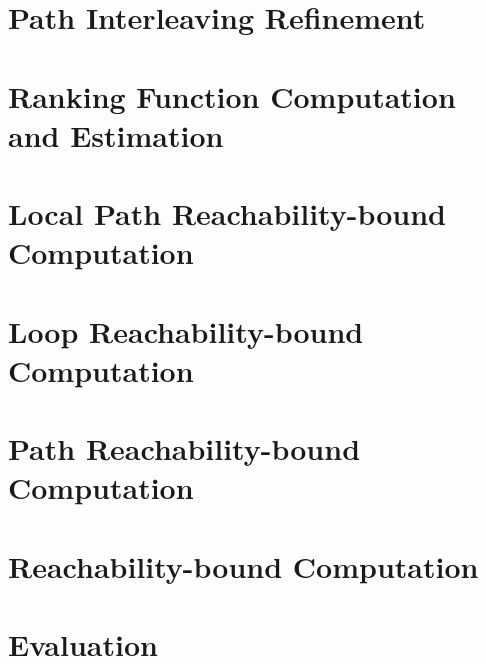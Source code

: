 \documentclass[manuscript,acmsmall,anonymous,review,screen,nonacm=true, authorversion=true]{acmart}
\begin{document}
\section{Path Interleaving Refinement}
\label{sec:refine}


\section{Ranking Function Computation and Estimation}
\label{sec:rank}

% 
\section{Local Path Reachability-bound Computation}
\label{sec:pathlocalrb}


\section{Loop Reachability-bound Computation}
\label{sec:looprb}

% 
\section{Path Reachability-bound Computation}
\label{sec:pathrb}


\section{Reachability-bound Computation}
\label{sec:alg-rb}


% 

\section{Evaluation}
\label{sec:eval}

\end{document}

